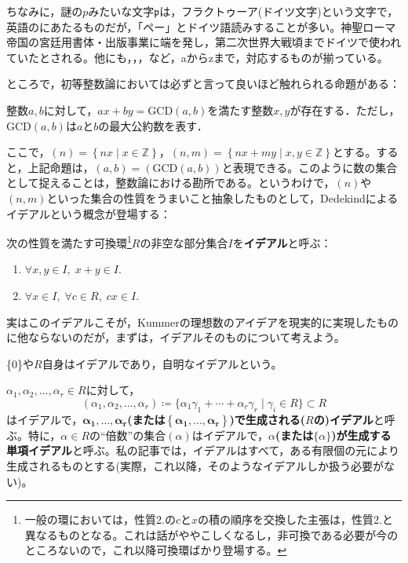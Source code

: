 ちなみに，謎の$p$みたいな文字$\mathfrak{p}$は，フラクトゥーア(ドイツ文字)という文字で，英語のにあたるものだが，「ペー」とドイツ語読みすることが多い。神聖ローマ帝国の宮廷用書体・出版事業に端を発し，第二次世界大戦頃までドイツで使われていたとされる。他にも，，，など，aからzまで，対応するものが揃っている。

ところで，初等整数論においては必ずと言って良いほど触れられる命題がある：
\begin{prop}
    整数$a, b$に対して，$ax+by=\mathrm{GCD}(a, b)$を満たす整数$x, y$が存在する．ただし，$\mathrm{GCD}(a ,b)$は$a$と$b$の最大公約数を表す．
\end{prop}
ここで，$(n)=\left\{nx\mid x\in\mathds{Z}\right\}$，$(n, m)=\left\{nx+my\mid x, y\in\mathds{Z}\right\}$とする。すると，上記命題は，$(a, b)=(\mathrm{GCD}(a, b))$と表現できる。このように数の集合として捉えることは，整数論における勘所である。というわけで，$(n)$や$(n, m)$といった集合の性質をうまいこと抽象したものとして，Dedekindによるイデアルという概念が登場する：

\begin{dfn}[イデアル]
    次の性質を満たす可換環\footnote{一般の環においては，性質2.の$c$と$x$の積の順序を交換した主張は，性質2.と異なるものとなる。これは話がややこしくなるし，非可換である必要が今のところないので，これ以降可換環ばかり登場する。}$R$の非空な部分集合$I$を\textbf{イデアル}と呼ぶ：
    \begin{enumerate}
        \item $\forall x, y\in I,\; x+y\in I$.
        \item $\forall x\in I,\; \forall c\in R,\; cx\in I$.
    \end{enumerate}
\end{dfn}
実はこのイデアルこそが，Kummerの理想数のアイデアを現実的に実現したものに他ならないのだが，まずは，イデアルそのものについて考えよう。

\{0\}や$R$自身はイデアルであり，自明なイデアルという。

$\alpha_1, \alpha_2,\ldots,\alpha_r\in R$に対して，\[
(\alpha_1, \alpha_2,\ldots,\alpha_r)\coloneqq \{\alpha_1\gamma_1+\cdots+\alpha_r\gamma_r\mid \gamma_i\in R\}\subset R
\]はイデアルで，\textbf{$\boldsymbol{\alpha_1,\ldots,\alpha_r}$(または$\boldsymbol{\left\{\alpha_1,\ldots,\alpha_r\right\}}$)で生成される($R$の)イデアル}と呼ぶ。特に，$\alpha\in R$の``倍数''の集合$(\alpha)$はイデアルで，\textbf{$\alpha$(または$\{\alpha\}$)が生成する単項イデアル}と呼ぶ。私の記事では，イデアルはすべて，ある有限個の元により生成されるものとする(実際，これ以降，そのようなイデアルしか扱う必要がない)。

